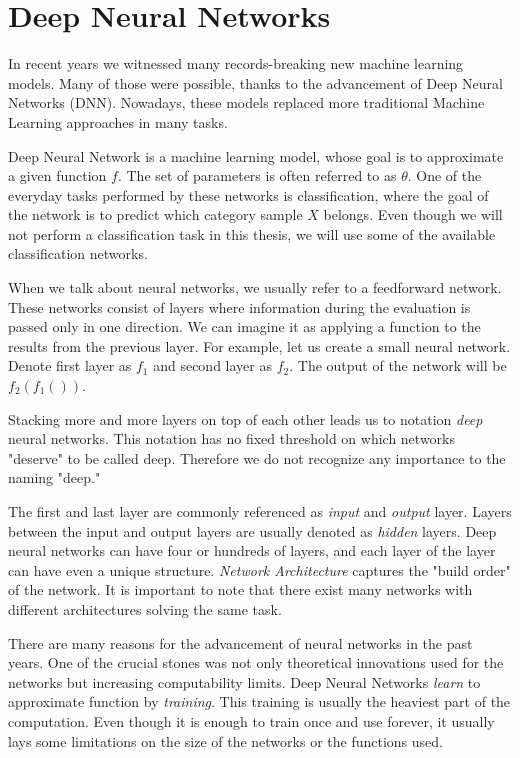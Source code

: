 \section{Deep Neural Networks}

In recent years we witnessed many records-breaking new machine learning models. Many of those were possible, thanks to the advancement of Deep Neural Networks (DNN). Nowadays, these models replaced more traditional Machine Learning approaches in many tasks.

Deep Neural Network is a machine learning model, whose goal is to approximate a given function \(f\). The set of parameters is often referred to as \(\theta\). One of the everyday tasks performed by these networks is classification, where the goal of the network is to predict which category sample \(X\) belongs. Even though we will not perform a classification task in this thesis, we will use some of the available classification networks.

When we talk about neural networks, we usually refer to a feedforward network. These networks consist of layers where information during the evaluation is passed only in one direction. We can imagine it as applying a function to the results from the previous layer. For example, let us create a small neural network. Denote first layer as \(f_1\) and second layer as \(f_2\). The output of the network will be \(f_2\left(f_1\left(\right)\right)\).

Stacking more and more layers on top of each other leads us to notation \emph{deep} neural networks. This notation has no fixed threshold on which networks "deserve" to be called deep. Therefore we do not recognize any importance to the naming "deep." 

The first and last layer are commonly referenced as \emph{input} and \emph{output} layer. Layers between the input and output layers are usually denoted as \emph{hidden} layers. Deep neural networks can have four or hundreds of layers, and each layer of the layer can have even a unique structure. \emph{Network Architecture} captures the "build order" of the network. It is important to note that there exist many networks with different architectures solving the same task.

There are many reasons for the advancement of neural networks in the past years. One of the crucial stones was not only theoretical innovations used for the networks but increasing computability limits. Deep Neural Networks \emph{learn} to approximate function by \emph{training}. This training is usually the heaviest part of the computation. Even though it is enough to train once and use forever, it usually lays some limitations on the size of the networks or the functions used.

